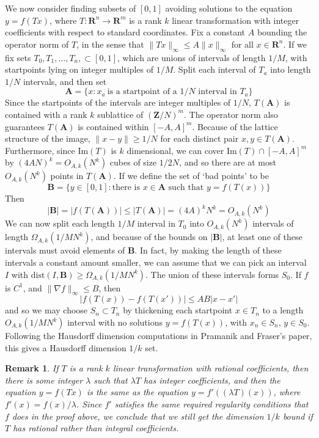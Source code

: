 \documentclass{report}
\theoremstyle{plain}
\theoremstyle{plain}
\newtheorem*{remark}{Remark}
\begin{document}
We now consider finding subsets of $[0,1]$ avoiding solutions to the equation $y = f(Tx)$, where $T: \mathbf{R}^n \to \mathbf{R}^m$ is a rank $k$ linear transformation with integer coefficients with respect to standard coordinates. Fix a constant $A$ bounding the operator norm of $T$, in the sense that $\| Tx \|_\infty \leq A \| x \|_\infty$ for all $x \in \mathbf{R}^n$. If we fix sets $T_0, T_1, \dots, T_n, \subset [0,1]$, which are unions of intervals of length $1/M$, with startpoints lying on integer multiples of $1/M$. Split each interval of $T_a$ into length $1/N$ intervals, and then set
%
\[ \mathbf{A} = \{ x : x_a\ \text{is a startpoint of a $1/N$ interval in $T_a$} \} \]
%
Since the startpoints of the intervals are integer multiples of $1/N$, $T(\mathbf{A})$ is contained with a rank $k$ sublattice of $(\mathbf{Z}/N)^m$. The operator norm also guarantees $T(\mathbf{A})$ is contained within $[-A,A]^m$. Because of the lattice structure of the image, $\| x - y \| \geq 1/N$ for each distinct pair $x,y \in T(\mathbf{A})$. Furthermore, since $\text{Im}(T)$ is $k$ dimensional, we can cover $\text{Im}(T) \cap [-A,A]^m$ by $(4AN)^k = O_{A,k}(N^k)$ cubes of size $1/2N$, and so there are at most $O_{A,k}(N^k)$ points in $T(\mathbf{A})$. If we define the set of `bad points' to be
%
\[ \mathbf{B} = \{ y \in [0,1] : \text{there is $x \in \mathbf{A}$ such that $y = f(T(x))$} \} \]
%
Then
%
\[ |\mathbf{B}| = |f(T(\mathbf{A}))| \leq |T(\mathbf{A})| = (4A)^k N^k = O_{A,k}(N^k) \]
We can now split each length $1/M$ interval in $T_0$ into $O_{A,k}(N^k)$ intervals of length $\Omega_{A,k}(1/MN^k)$, and because of the bounds on $|\mathbf{B}|$, at least one of these intervals must avoid elements of $\mathbf{B}$. In fact, by making the length of these intervals a constant amount smaller, we can assume that we can pick an interval $I$ with $\text{dist}(I,\mathbf{B}) \geq \Omega_{A,k}(1/MN^k)$. The union of these intervals forms $S_0$. If $f$ is $C^1$, and $\| \nabla f \|_\infty \leq B$, then
%
\[ | f(T(x)) - f(T(x'))| \leq AB |x - x'| \]
%
and so we may choose $S_n \subset T_n$ by thickening each startpoint $x \in T_n$ to a length $O_{A,k}(1/MN^k)$ interval with no solutions $y = f(T(x))$, with $x_n \in S_n$, $y \in S_0$. Following the Hausdorff dimension computations in Pramanik and Fraser's paper, this gives a Hausdorff dimension $1/k$ set.

\begin{remark}
    If $T$ is a rank $k$ linear transformation with rational coefficients, then there is some integer $\lambda$ such that $\lambda T$ has integer coefficients, and then the equation $y = f(Tx)$ is the same as the equation $y = f'((\lambda T)(x))$, where $f'(x) = f(x)/\lambda$. Since $f'$ satisfies the same required regularity conditions that $f$ does in the proof above, we conclude that we still get the dimension $1/k$ bound if $T$ has rational rather than integral coefficients.
\end{remark}
\end{document}
